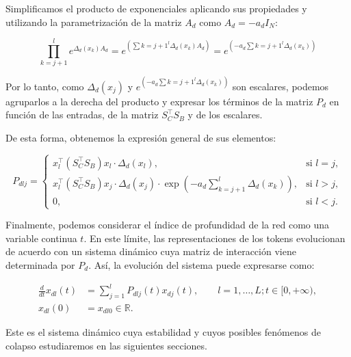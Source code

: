 Simplificamos el producto de exponenciales aplicando sus propiedades y utilizando la parametrización de la 
matriz $A_d$ como $A_d=-a_dI_N$:

\[
\prod_{k=j+1}^{l}e^{\Delta_d(x_k)A_d} = e^{\left(\sum{k=j+1}^{l}\Delta_d(x_k)A_d\right)} = 
e^{\left(-a_d\sum{k=j+1}^{l}\Delta_d(x_k)\right)}
\]

Por lo tanto, como $\Delta_d(x_j)$ y $e^{\left(-a_d\sum{k=j+1}^{l}\Delta_d(x_k)\right)}$ son escalares, 
podemos agruparlos a la derecha del producto y expresar los términos de la matriz $P_d$ en función de 
las entradas, de la matriz $S_C^\top S_B$ y de los escalares.

De esta forma, obtenemos la expresión general de sus elementos:

\begin{equation}
\label{eq:p-dlj}
P_{dlj} =
\begin{cases}
x_l^\top (S_C^\top S_B)x_l \cdot \Delta_d(x_l),
& \text{si } l=j,\\[6pt]
x_l^\top (S_C^\top S_B)x_j \cdot \Delta_d(x_j)
\cdot \exp\left(-a_d\displaystyle\sum_{k=j+1}^{l}
\Delta_d(x_k)\right),
& \text{si } l>j,\\[6pt]
0,
& \text{si } l<j.
\end{cases}
\end{equation}

Finalmente, podemos considerar el índice de profundidad de la red como una variable continua $t$. En 
este límite, las representaciones de los tokens evolucionan de acuerdo con un sistema dinámico cuya 
matriz de interacción viene determinada por $P_d$. Así, la evolución del sistema puede expresarse como:

\begin{equation}
\label{eq:state-dynamics}
\begin{aligned}
\frac{d}{dt}x_{dl}(t) &= \sum_{j=1}^{l} P_{dlj}(t)x_{dj}(t),
\qquad l=1,\ldots,L; t \in [0,+\infty),\\
x_{dl}(0) &= x_{dl0} \in \mathbb{R}.
\end{aligned}
\end{equation}

Este es el sistema dinámico cuya estabilidad y cuyos posibles fenómenos de colapso estudiaremos en las 
siguientes secciones.
